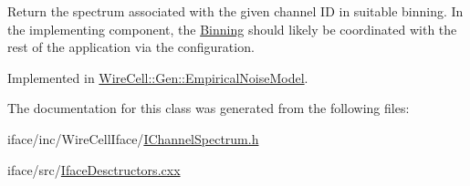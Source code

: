 Return the spectrum associated with the given channel ID in suitable binning. In the implementing component, the \hyperlink{class_wire_cell_1_1_binning}{Binning} should likely be coordinated with the rest of the application via the configuration. 

Implemented in \hyperlink{class_wire_cell_1_1_gen_1_1_empirical_noise_model_a9ed3c28256c1c262064c62816b4b225f}{Wire\+Cell\+::\+Gen\+::\+Empirical\+Noise\+Model}.



The documentation for this class was generated from the following files\+:\begin{DoxyCompactItemize}
\item 
iface/inc/\+Wire\+Cell\+Iface/\hyperlink{_i_channel_spectrum_8h}{I\+Channel\+Spectrum.\+h}\item 
iface/src/\hyperlink{_iface_desctructors_8cxx}{Iface\+Desctructors.\+cxx}\end{DoxyCompactItemize}
